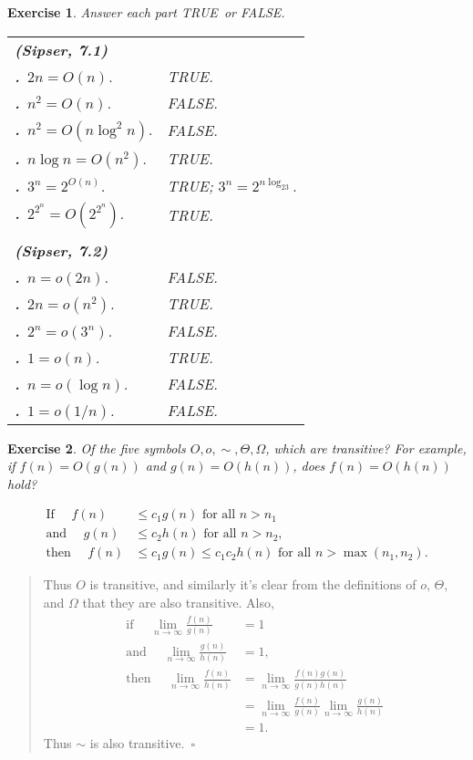 \documentclass{article}
\theoremstyle{break}			%
\newtheorem{exercise}{Exercise}
\theoremstyle{plain}
\renewcommand{\thesubexercise}{\alph{subexercise}.}
\newenvironment{answer}{\begin{quotation}\noindent}{\end{quotation}}
\newcommand{\sipser}{\textit{Sipser}}
\renewcommand{\qed}{~\ensuremath{\square}}
\renewcommand{\true}{\textsc{TRUE}}
\renewcommand{\false}{\textsc{FALSE}}
\renewcommand{\liminf}{\ensuremath{\lim_{n\to\infty}}}
\renewcommand{\a}{\stepcounter{subexercise}\textbf{\thesubexercise}\ }
\begin{document}
\begin{exercise}
Answer each part \true\ or \false.

\begin{tabular}{ll}
\textbf{(\sipser, 7.1)} \\
\a $2n=O(n)$. 		& \true.	\\
\a $n^2=O(n)$.		& \false.	\\
\a $n^2=O(n\log^2n)$.	& \false.	\\
\a $n\log n=O(n^2)$.	& \true.	\\
\a $3^n=2^{O(n)}$.	& \true; $3^n=2^{n\log_23}.$\\
\a $2^{2^n}=O(2^{2^n})$.& \true.	\\
\\
\textbf{(\sipser, 7.2)} \setcounter{subexercise}{0}\\
\a $n=o(2n)$.		& \false.	\\
\a $2n=o(n^2)$.		& \true.	\\
\a $2^n=o(3^n)$.	& \false.	\\
\a $1=o(n)$.		& \true.	\\
\a $n=o(\log n)$.	& \false.	\\
\a $1=o(1/n)$.		& \false.	\\
\end{tabular}
\end{exercise}

\begin{exercise}
Of the five symbols $O, o, \sim, \Theta, \Omega$, which are
transitive?  For example, if $f(n)=O(g(n))$ and $g(n)=O(h(n))$, does
$f(n)=O(h(n))$ hold?
\end{exercise}
\begin{align*}
\text{If }   \quad f(n)&\leq c_1g(n)\text{ for all }n>n_1 \\
\text{and }  \quad g(n)&\leq c_2h(n)\text{ for all }n>n_2,\\
\text{then } \quad f(n)&\leq c_1g(n)\leq c_1c_2h(n)
				    \text{ for all }n>\max(n_1,n_2).
\end{align*}
\begin{answer}
Thus $O$ is transitive, and similarly it's clear from the definitions
of $o$, $\Theta$, and $\Omega$ that they are also transitive.  Also,
\begin{align*}
\text{if }   \quad\liminf\frac{f(n)}{g(n)}&=1\\
\text{and }  \quad\liminf\frac{g(n)}{h(n)}&=1,\\
\text{then } \quad\liminf\frac{f(n)}{h(n)}
&=\liminf\frac{f(n)g(n)}{g(n)h(n)} \\
&=\liminf\frac{f(n)}{g(n)}\liminf\frac{g(n)}{h(n)} \\
&=1.
\end{align*}
Thus $\sim$ is also transitive.\qed
\end{answer}
\end{document}
